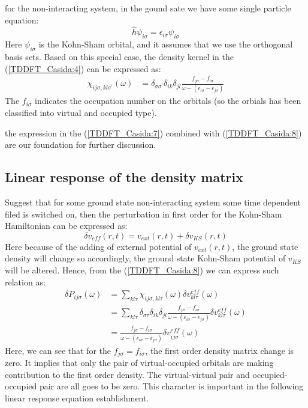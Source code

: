 for the non-interacting system, in the gound sate we have some single
particle equation:
\begin{equation}
 \label{TDDFT_Casida:5}
\hat{h}\psi_{i\sigma} = \epsilon_{i\sigma}\psi_{i\sigma}
\end{equation} 
Here $\psi_{i\sigma}$ is the Kohn-Sham orbital, and it assumes that
we use the orthogonal basis sets. Based on this special case, the
density kernel in the (\ref{TDDFT_Casida:4}) can be expressed
as:
\begin{align}
  \label{TDDFT_Casida:7}
\chi_{ij\sigma, kl\sigma^{'}}(\omega) &=
\delta_{\sigma\sigma^{'}}\delta_{ik}\delta_{jl}\frac{
f_ { j\sigma} -
f_{i\sigma}}{\omega - (\epsilon_{i\sigma} - \epsilon_{j\sigma})}
\end{align} 
The $f_{i\sigma}$ indicates the occupation number on the orbitals (so
the orbials has been classified into virtual and occupied type).

the expression in the (\ref{TDDFT_Casida:7}) combined with
(\ref{TDDFT_Casida:8}) are our foundation for further discussion. 

\subsection{Linear response of the density matrix}
%
%
%
%
%
Suggest that for some ground state non-interacting system some time
dependent filed is switched on, then the perturbation in first order
for the Kohn-Sham Hamiltonian can be expressed as:
\begin{equation}
 \label{TDDFT_Casida:9}
\delta v_{eff}(r,t) =  v_{ext}(r,t) + \delta v_{KS}(r,t)
\end{equation} 
Here because of the adding of external potential of $v_{ext}(r,t)$,
the ground state density will change so accordingly, the ground state
Kohn-Sham potential of $v_{KS}$ will be altered. Hence, from the
(\ref{TDDFT_Casida:8}) we can express such relation as:
\begin{align}
\label{TDDFT_Casida:10}
 \delta P_{ij\sigma} (\omega) &= \sum_{kl\tau} \chi_{ij\sigma,
kl\tau}(\omega) \delta v^{eff}_{kl\tau} (\omega ) \nonumber \\
&=
\sum_{kl\tau} 
\delta_{\sigma\tau}\delta_{ik}\delta_{jl}\frac{f_{j\sigma} -
f_{i\sigma}}{\omega - (\epsilon_{i\sigma} - \epsilon_{j\sigma})}
\delta v^{eff}_{kl\tau} (\omega ) \nonumber \\
&= \frac{f_{j\sigma} - f_{i\sigma}}{\omega - (\epsilon_{i\sigma} -
\epsilon_{j\sigma})}
\delta v^{eff}_{ij\sigma} (\omega )
\end{align} 
Here, we can see that for the $f_{j\sigma} = f_{i\sigma}$, the first
order density matrix change is zero. It implies that only the pair of
virtual-occupied orbitals are making contribution to the first order
density. The virtual-virtual pair and occupied-occupied pair are all
goes to be zero. This character is important in the following
linear response equation establishment.

